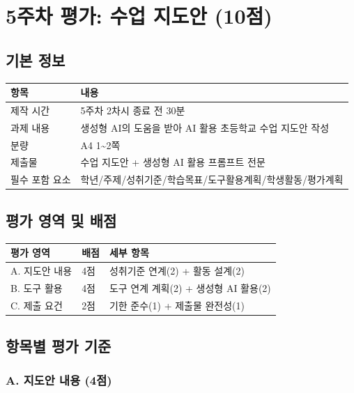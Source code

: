 \documentclass[a4paper,11pt]{ltjsarticle}
\begin{document}
\section{5주차 평가: 수업 지도안 (10점)}

\subsection{기본 정보}

\noindent
\begin{tabularx}{\textwidth}{|p{2.5cm}|X|}
\hline
\textbf{항목} & \textbf{내용} \\ \hline
제작 시간 & 5주차 2차시 종료 전 30분 \\ \hline
과제 내용 & 생성형 AI의 도움을 받아 AI 활용 초등학교 수업 지도안 작성 \\ \hline
분량 & A4 1\textasciitilde{}2쪽 \\ \hline
제출물 & 수업 지도안 + 생성형 AI 활용 프롬프트 전문 \\ \hline
필수 포함 요소 & 학년/주제/성취기준/학습목표/도구활용계획/학생활동/평가계획 \\ \hline
\end{tabularx}

\subsection{평가 영역 및 배점}

\noindent
\begin{tabularx}{\textwidth}{|X|>{\centering\arraybackslash}p{1.3cm}|X|}
\hline
\textbf{평가 영역} & \textbf{배점} & \textbf{세부 항목} \\ \hline
A. 지도안 내용 & 4점 & 성취기준 연계(2) + 활동 설계(2) \\ \hline
B. 도구 활용 & 4점 & 도구 연계 계획(2) + 생성형 AI 활용(2) \\ \hline
C. 제출 요건 & 2점 & 기한 준수(1) + 제출물 완전성(1) \\ \hline
\end{tabularx}

\subsection{항목별 평가 기준}

\subsubsection{A. 지도안 내용 (4점)}
\end{document}
